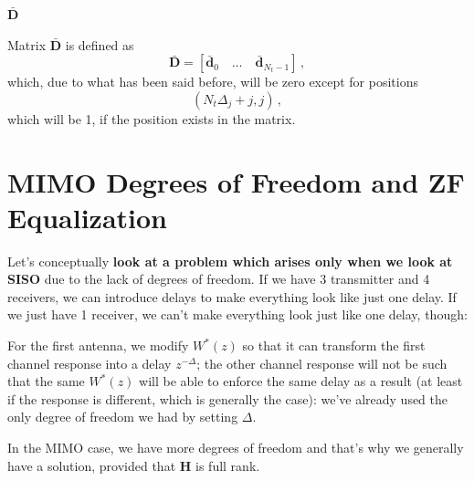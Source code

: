 \documentclass[a4paper, 12pt]{book}
\begin{document}
\begin{tcolorbox}[colback=obsidianBlue, colframe=white, boxrule=0pt, sharp corners]
    \textcolor{obsidianTextBlue}{\textbf{\faAtom $\bar{\mathbf{D}}$}}
    
    Matrix $\bar{\mathbf{D}}$ is defined as
    \[ \bar{\mathbf{D}} = [\bar{\mathbf{d}}_0 \quad \dots \quad \bar{\mathbf{d}}_{N_t-1}] \,, \]
    which, due to what has been said before, will be zero except for positions
    \[ (N_t\Delta_j + j, j) \,, \]
    which will be 1, if the position exists in the matrix.
\end{tcolorbox}

\section{MIMO Degrees of Freedom and ZF Equalization}

Let's conceptually \textbf{look at a problem which arises only when we look at SISO} due to the lack of degrees of freedom.
If we have 3 transmitter and 4 receivers, we can introduce delays to make everything look like just one delay.
If we just have 1 receiver, we can't make everything look just like one delay, though:

\begin{center}
\end{center}

For the first antenna, we modify $W^*(z)$ so that it can transform the first channel response into a delay $z^{-\Delta}$; the other channel response will not be such that the same $W^*(z)$ will be able to enforce the same delay as a result (at least if the response is different, which is generally the case): we've already used the only degree of freedom we had by setting $\Delta$.

\begin{remark}
In the MIMO case, we have more degrees of freedom and that's why we generally have a solution, provided that $\mathbf{H}$ is full rank.
\end{remark}
\end{document}
